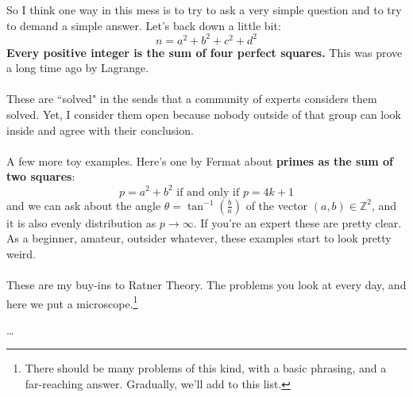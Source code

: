 \documentclass[12pt]{article}
\begin{document}
\newpage

\noindent So I think one way in this mess is to try to ask a very simple question and to try to demand a simple answer.  Let's back down a little bit:
$$ n = a^2 + b^2 + c^2 + d^2 $$
\textbf{Every positive integer is the sum of four perfect squares.} This was prove a long time ago by Lagrange.  \\ \\
These are ``solved" in the sends that a community of experts considers them solved.  Yet, I consider them open because nobody outside of that group can look inside and agree with their conclusion. \\ \\
A few more toy examples.  Here's one by Fermat about \textbf{primes as the sum of two squares}:
$$ p = a^2 + b^2 \text{ if and only if } p = 4k+1 $$
and we can ask about the angle $\theta = \tan^{-1}(\frac{b}{a})$ of the vector $(a,b) \in \mathbb{Z}^2$, and it is also evenly distribution as $p \to \infty$. If you're an expert these are pretty clear.  As a beginner, amateur, outsider whatever, these examples start to look pretty weird. \\ \\
These are my buy-ins to Ratner Theory.  The problems you look at every day, and here we put a microscope.\footnote{There should be many problems of this kind, with a basic phrasing, and a far-reaching answer.  Gradually, we'll add to this list.}
\vfill



\begin{thebibliography}{} 

\item \dots 

\end{thebibliography}
\end{document}
